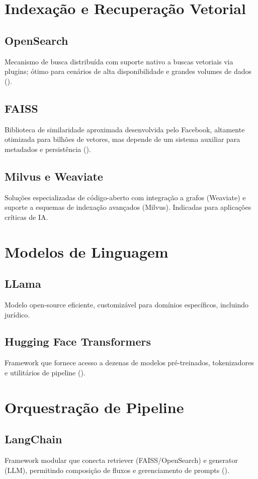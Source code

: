 \section{Indexação e Recuperação Vetorial}
\subsection{OpenSearch}
Mecanismo de busca distribuída com suporte nativo a buscas vetoriais via plugins; ótimo para cenários de alta disponibilidade e grandes volumes de dados (\cite{taipalus2024vector}).

\subsection{FAISS}
Biblioteca de similaridade aproximada desenvolvida pelo Facebook, altamente otimizada para bilhões de vetores, mas depende de um sistema auxiliar para metadados e persistência (\cite{facebookresearch2024faiss}).

\subsection{Milvus e Weaviate}
Soluções especializadas de código-aberto com integração a grafos (Weaviate) e suporte a esquemas de indexação avançados (Milvus). Indicadas para aplicações críticas de IA.

\section{Modelos de Linguagem}
\subsection{LLama}
Modelo open-source eficiente, customizável para domínios específicos, incluindo jurídico.

\subsection{Hugging Face Transformers}
Framework que fornece acesso a dezenas de modelos pré-treinados, tokenizadores e utilitários de pipeline (\cite{huggingface2024transformers}).

\section{Orquestração de Pipeline}
\subsection{LangChain}
Framework modular que conecta retriever (FAISS/OpenSearch) e generator (LLM), permitindo composição de fluxos e gerenciamento de prompts (\cite{langchain2024}).

